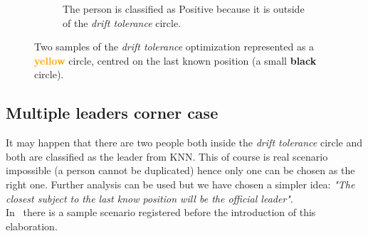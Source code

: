 \begin{figure}[!h]
\begin{subfigure}[!h]{0.39\textwidth}
		\caption{The person is classified as Positive because it is outside of the \textit{drift tolerance} circle.}
		\label{fig:driftOptimizationOk}
	\end{subfigure}
	\captionsetup{margin=1.4cm}
	\caption[Two samples of the \textit{drift tolerance} optimization.]{Two samples of the \textit{drift tolerance} optimization represented as a \textbf{\textcolor{orange}{yellow}} circle, centred on the last known position (a small \textbf{black} circle).}
	\label{fig:driftOptimization}
\end{figure}

\subsection{Multiple leaders corner case} \label{sec:multipleleaders}
It may happen that there are two people both inside the \textit{drift tolerance} circle and both are classified as the leader from KNN. This of course is real scenario impossible (a person cannot be duplicated) hence only one can be chosen as the right one. Further analysis can be used but we have chosen a simpler idea: \textit{"The closest subject to the last know position will be the official leader"}.\\
In~ there is a sample scenario registered before the introduction of this elaboration.
